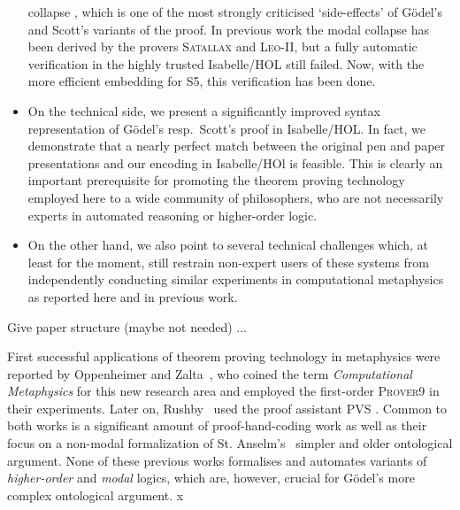\documentclass{article}
\begin{document}
\begin{itemize}
  collapse \cite{Sobel}, which is one of the most strongly criticised
  `side-effects' of G\"odel's and Scott's variants of the proof. In previous work
  the modal collapse has been derived by the provers
  \textsc{Satallax} \cite{Satallax} and \textsc{Leo-II}, but a fully automatic
  verification in the highly trusted Isabelle/HOL still failed. 
  Now, with the more efficient embedding for S5, this verification has been done. 
\item On the technical side, we present a significantly improved
  syntax representation of G\"odel's resp.~Scott's proof in
  Isabelle/HOL. In fact, we demonstrate that a nearly perfect match
  between the original pen and paper presentations and our encoding in
  Isabelle/HOl is feasible. This is clearly an important prerequisite
  for promoting the theorem proving technology employed here to a wide community of
  philosophers, who are not necessarily experts in automated reasoning or higher-order logic.
\item On the other hand, we
  also point to several technical challenges which, at least for the
  moment, still restrain non-expert users of these systems from
  independently conducting similar experiments in computational
  metaphysics as reported here and in previous work. 
\end{itemize}


Give paper structure (maybe not needed) ...


First successful applications of theorem proving technology in
metaphysics were reported by Oppenheimer and
Zalta~, who coined the term \textit{Computational Metaphysics} for this new research area and employed the first-order
\textsc{Prover9} \cite{Prover9} in their experiments. Later on, Rushby~ used the proof assistant \textsc{PVS} \cite{PVS}. Common to both
works is a significant amount of proof-hand-coding work as well as their
focus on a non-modal formalization of St. Anselm's~ simpler 
and older ontological argument. 
None of these previous works formalises and automates variants of \emph{higher-order} and \emph{modal} logics, which are, however, crucial
for G\"{o}del's more complex ontological argument.
x
\end{document}
